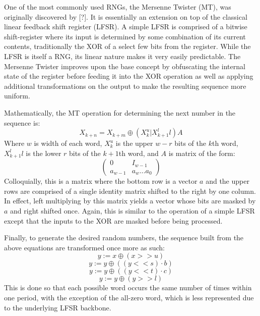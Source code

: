 One of the most commonly used RNGs, the Mersenne Twister (MT), was originally discovered by [?]. It is essentially an extension on top of the classical linear feedback shift register (LFSR). A simple LFSR is comprised of a bitwise shift-register where its input is determined by some combination of its current contents, traditionally the XOR of a select few bits from the register. While the LFSR is itself a RNG, its linear nature makes it very easily predictable. The Mersenne Twister improves upon the base concept by obfuscating the internal state of the register before feeding it into the XOR operation as well as applying additional transformations on the output to make the resulting sequence more uniform.

Mathematically, the MT operation for determining the next number in the sequence is:
\begin{equation} \label{eq:mt}
    X_{k+n} = X_{k+m} \oplus (X_k^u | X_{k+1}^ll)A
\end{equation}
Where $w$ is width of each word, $X_k^u$ is the upper $w-r$ bits of the $k$th word, $X_{k+1}^ll$ is the lower $r$ bits of the $k+1$th word, and $A$ is matrix of the form:
\[ \left( \begin{array}{ccc}
0 & I_{w-1} \\
a_{w-1} & {a_w ... a_0} \end{array} \right)\]
Colloquially, this is a matrix where the bottom row is a vector $a$ and the upper rows are comprised of a single identity matrix shifted to the right by one column. In effect, left multiplying by this matrix yields a vector whose bits are masked by $a$ and right shifted once. Again, this is similar to the operation of a simple LFSR except that the inputs to the XOR are masked before being processed.

Finally, to generate the desired random numbers, the sequence built from the above equations are transformed once more as such:
\begin{equation} \label{eq:mt_t1}
    y := x \oplus (x >> u)
\end{equation}
\begin{equation} \label{eq:mt_t2}
    y := y \oplus ((y << s) \cdot b)
\end{equation}
\begin{equation} \label{eq:mt_t3}
    y := y \oplus ((y << t) \cdot c)
\end{equation}
\begin{equation} \label{eq:mt_t4}
    y := y \oplus (y >> l)
\end{equation}
This is done so that each possible word occurs the same number of times within one period, with the exception of the all-zero word, which is less represented due to the underlying LFSR backbone.

